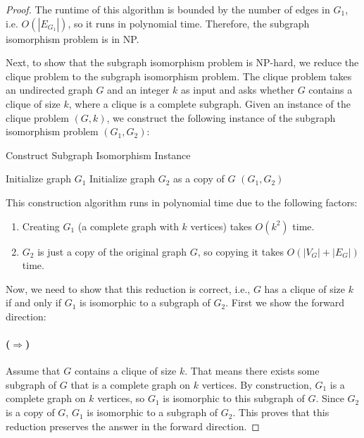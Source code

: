 \documentclass{article}
\begin{document}
\begin{proof}
    The runtime of this algorithm is bounded by the number of edges in $G_1$, i.e. $O(|E_{G_1}|)$, so it runs in polynomial time.
    Therefore, the subgraph isomorphism problem is in NP.

    \noindent Next, to show that the subgraph isomorphism problem is NP-hard, we reduce the clique problem to the subgraph isomorphism problem.
    The clique problem takes an undirected graph $G$ and an integer $k$ as input and asks whether $G$ contains a clique of size $k$, where a clique is a complete subgraph.
    Given an instance of the clique problem $(G, k)$, we construct the following instance of the subgraph isomorphism problem $(G_1, G_2)$:

    \begin{algorithm}
        \caption{Construct Subgraph Isomorphism Instance}
        Initialize graph $G_1$\;
        Initialize graph $G_2$ as a copy of $G$\;
        \Return $(G_1, G_2)$\;
    \end{algorithm}

    This construction algorithm runs in polynomial time due to the following factors:
    
    \begin{enumerate}
        \item Creating $G_1$ (a complete graph with $k$ vertices) takes $O(k^2)$ time.
        \item $G_2$ is just a copy of the original graph $G$, so copying it takes $O(|V_G| + |E_G|)$ time.
    \end{enumerate}

    Now, we need to show that this reduction is correct, i.e., $G$ has a clique of size $k$ if and only if $G_1$ is isomorphic to a subgraph of $G_2$.
    First we show the forward direction:
    \paragraph{($\Rightarrow$)}
    Assume that $G$ contains a clique of size $k$.
    That means there exists some subgraph of $G$ that is a complete graph on $k$ vertices.
    By construction, $G_1$ is a complete graph on $k$ vertices, so $G_1$ is isomorphic to this subgraph of $G$.
    Since $G_2$ is a copy of $G$, $G_1$ is isomorphic to a subgraph of $G_2$.
    This proves that this reduction preserves the answer in the forward direction.
    

\end{proof}
\end{document}
